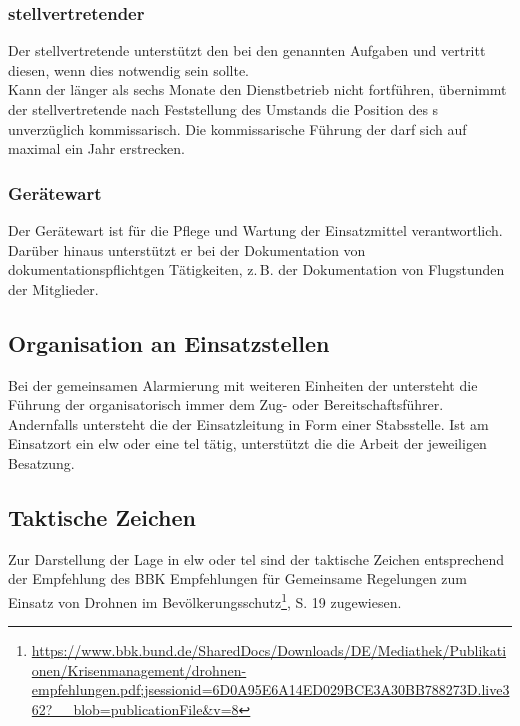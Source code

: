 \subsubsection{stellvertretender \gruppenfuehrer{}}

Der stellvertretende \gruppenfuehrer{} unterstützt den \gruppenfuehrer{} bei den genannten Aufgaben und vertritt diesen, wenn dies notwendig sein sollte.\\

\noindent Kann der \gruppenfuehrer{} länger als sechs Monate den Dienstbetrieb nicht fortführen, übernimmt der stellvertretende \gruppenfuehrer{} nach Feststellung des Umstands die Position des \gruppenfuehrer{}s unverzüglich kommissarisch. Die kommissarische Führung der \callee{} darf sich auf maximal ein Jahr erstrecken.

\subsubsection{Gerätewart}

Der Gerätewart ist für die Pflege und Wartung der Einsatzmittel verantwortlich. Darüber hinaus unterstützt er bei der Dokumentation von dokumentationspflichtgen Tätigkeiten, z.\,B. der Dokumentation von Flugstunden der Mitglieder.

\subsection{Organisation an Einsatzstellen}

Bei der gemeinsamen Alarmierung mit weiteren Einheiten der \unit{} untersteht die Führung der \callee{} organisatorisch immer dem Zug- oder Bereitschaftsführer.\\

\noindent Andernfalls untersteht die \callee{} der Einsatzleitung in Form einer Stabsstelle. Ist am Einsatzort ein \ac{elw} oder eine \ac{tel} tätig, unterstützt die \callee{} die Arbeit der jeweiligen Besatzung.

\subsection{Taktische Zeichen}

Zur Darstellung der Lage in \ac{elw} oder \ac{tel} sind der \callee{} taktische Zeichen entsprechend der Empfehlung des BBK Empfehlungen für \flq Gemeinsame Regelungen zum Einsatz von Drohnen im Bevölkerungsschutz\frq{}\footnote{\url{https://www.bbk.bund.de/SharedDocs/Downloads/DE/Mediathek/Publikationen/Krisenmanagement/drohnen-empfehlungen.pdf;jsessionid=6D0A95E6A14ED029BCE3A30BB788273D.live362?__blob=publicationFile&v=8}}, S. 19 zugewiesen.\\

